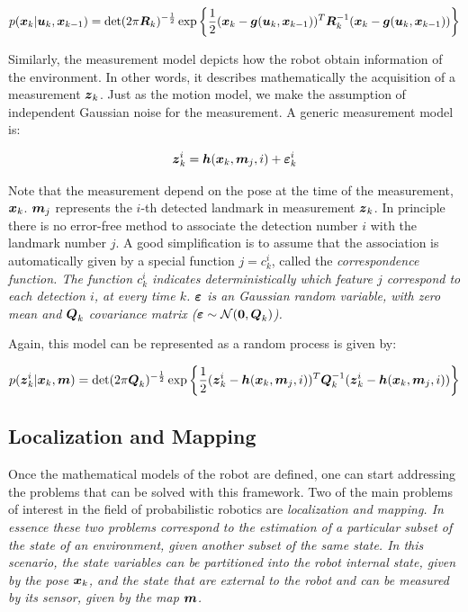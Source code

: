 \begin{equation}
p(\boldsymbol{x}_k|\boldsymbol{u}_k,\boldsymbol{x}_{k-1}) = \det(2\pi \boldsymbol{R}_k)^{-\frac{1}{2}}\exp\left\lbrace \frac{1}{2}(\boldsymbol{x}_k-\boldsymbol{g}(\boldsymbol{u}_k,\boldsymbol{x}_{k-1}))^T
\boldsymbol{R}_k^{-1}(\boldsymbol{x}_k-\boldsymbol{g}(\boldsymbol{u}_k,\boldsymbol{x}_{k-1}))\right\rbrace
\label{eq:motion-pdf}
\end{equation}

Similarly, the measurement model depicts how the robot obtain information of the environment. In other words, it describes mathematically the acquisition of a measurement $\boldsymbol{z}_k$. Just as the motion model, we make the assumption of independent Gaussian noise for the measurement. A generic measurement model is:

\begin{equation}
\boldsymbol{z}_k^i = \boldsymbol{h}(\boldsymbol{x}_k,\boldsymbol{m}_j,i) + \boldsymbol{\varepsilon}_k^i
\end{equation} 

\noindent
Note that the measurement depend on the pose at the time of the measurement, $\boldsymbol{x}_k$. $\boldsymbol{m}_j$ represents the $i$-th detected landmark in measurement $\boldsymbol{z}_k$. In principle there is no error-free method to associate the detection number $i$ with the landmark number $j$. A good simplification is to assume that the association is automatically given by a special function $j=c_k^i$, called the \it{correspondence function}. The function $c_k^i$ indicates deterministically which feature $j$ correspond to each detection $i$, at every time $k$. $\boldsymbol{\varepsilon}$ is an Gaussian random variable, with zero mean and $\boldsymbol{Q}_k$ covariance matrix ($\boldsymbol{\varepsilon} \sim \mathcal{N}(\boldsymbol{0},\boldsymbol{Q}_k)$).

Again, this model can be represented as a random process is given by:

\begin{equation}
p(\boldsymbol{z}_k^i|\boldsymbol{x}_k,\boldsymbol{m}) = \det(2\pi \boldsymbol{Q}_k)^{-\frac{1}{2}}\exp\left\lbrace \frac{1}{2}(\boldsymbol{z}_k^i-\boldsymbol{h}(\boldsymbol{x}_k,\boldsymbol{m}_j,i))^T
\boldsymbol{Q}_k^{-1}(\boldsymbol{z}_k^i-\boldsymbol{h}(\boldsymbol{x}_k,\boldsymbol{m}_j,i))\right\rbrace 
\label{eq:measure-pdf}
\end{equation}

\subsection{Localization and Mapping}

Once the mathematical models of the robot are defined, one can start addressing the problems that can be solved with this framework. Two of the main problems of interest in the field of probabilistic robotics are \it{localization} and \it{mapping}. In essence these two problems correspond to the estimation of a particular subset of the state of an environment, given another subset of the same state. In this scenario, the state variables can be partitioned into the robot internal state, given by the pose $\boldsymbol{x}_k$, and the state that are external to the robot and can be measured by its sensor, given by the map $\boldsymbol{m}$.

